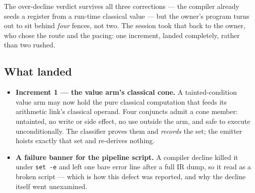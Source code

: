 The over-decline verdict survives all three corrections --- the compiler already seeds a register
from a run-time classical value --- but the owner's program turns out to sit behind \emph{four}
fences, not two. The session took that back to the owner, who chose the route and the pacing: one
increment, landed completely, rather than two rushed.

\subsection*{What landed}
\begin{itemize}
  \item \textbf{Increment 1 --- the value arm's classical cone.} A tainted-condition value arm may now
        hold the pure classical computation that feeds its arithmetic link's classical operand. Four
        conjuncts admit a cone member: untainted, no write or side effect, no use outside the arm, and
        safe to execute unconditionally. The classifier proves them and \emph{records} the set; the
        emitter hoists exactly that set and re-derives nothing.
  \item \textbf{A failure banner for the pipeline script.} A compiler decline killed it under
        \texttt{set -e} and left one bare error line after a full IR dump, so it read as a broken
        script --- which is how this defect was reported, and why the decline itself went unexamined.
\end{itemize}

